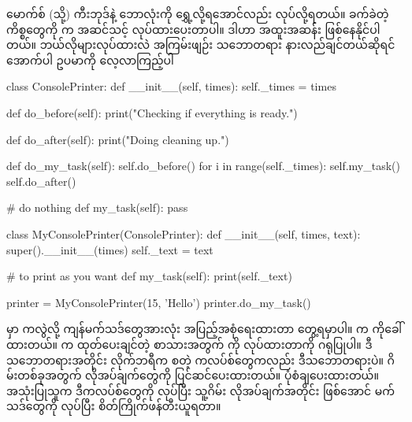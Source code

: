 မောက်စ် (သို့) ကီးဘုဒ်နဲ့ ဘောလုံးကို ရွှေ့လို့ရအောင်လည်း လုပ်လို့ရတယ်။ ခက်ခဲတဲ့ ကိစ္စတွေကို  က အဆင်သင့် လုပ်ထားပေးတာပါ။ ဒါဟာ အထူးအဆန်း ဖြစ်နေနိုင်ပါတယ်။ ဘယ်လိုများလုပ်ထားလဲ အကြမ်းဖျဉ်း သဘောတရား နားလည်ချင်တယ်ဆိုရင် အောက်ပါ ဥပမာကို လေ့လာကြည့်ပါ 
%
\begin{py}
class ConsolePrinter:
    def __init__(self, times):
        self._times = times
        
    def do_before(self):
        print("Checking if everything is ready.")
        
    def do_after(self):
        print("Doing cleaning up.")

    def do_my_task(self):
        self.do_before()
        for i in range(self._times):
            self.my_task()
        self.do_after()

    # do nothing    
    def my_task(self):
        pass


class MyConsolePrinter(ConsolePrinter):
    def __init__(self, times, text):
        super().__init__(times)
        self._text = text

    # to print as you want
    def my_task(self):
        print(self._text)


printer = MyConsolePrinter(15, 'Hello')
printer.do_my_task()
\end{py}
%
  မှာ  ကလွဲလို့ ကျန်မက်သဒ်တွေအားလုံး အပြည့်အစုံရေးထားတာ တွေ့ရမှာပါ။  က  ကိုခေါ်ထားတယ်။  က ထုတ်ပေးချင်တဲ့ စာသားအတွက်  ကို  လုပ်ထားတာကို ဂရုပြုပါ။ ဒီသဘောတရားအတိုင်း  လိုက်ဘရီက \fEn{,} \fEn{,}  စတဲ့ ကလပ်စ်တွေကလည်း ဒီသဘောတရားပဲ။ ဂိမ်းတစ်ခုအတွက် လိုအပ်ချက်တွေကို ပြင်ဆင်ပေးထားတယ်။ ပုံစံချပေးထားတယ်။ အသုံးပြုသူက ဒီကလပ်စ်တွေကို  လုပ်ပြီး သူ့ဂိမ်း လိုအပ်ချက်အတိုင်း ဖြစ်အောင် မက်သဒ်တွေကို  လုပ်ပြီး စိတ်ကြိုက်ဖန်တီးယူရတာ။


